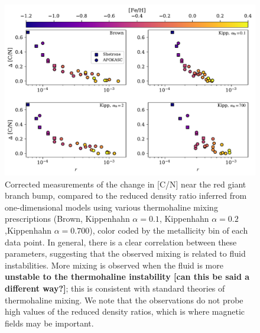

\begin{figure}[!tb]
\begin{center}
\includegraphics[width=\textwidth]{./figures/mixing_vs_r/mixing_vs_r.pdf}%
\caption{Corrected measurements of the change in [C/N] near the red giant branch bump, compared to the reduced density ratio inferred from one-dimensional models using various thermohaline mixing prescriptions (Brown, Kippenhahn $\alpha=0.1$, Kippenhahn $\alpha=0.2$,Kippenhahn $\alpha=0.700$), color coded by the metallicity bin of each data point. In general, there is a clear correlation between these parameters, suggesting that the observed mixing is related to fluid instabilities. More mixing is observed when the fluid is more \textbf{unstable to the thermohaline instability [can this be said a different way?]}; this is consistent with standard theories of thermohaline mixing. We note that the observations do not probe high values of the reduced density ratios, which is where magnetic fields may be important.
\label{Fig:punchline}
}
\end{center}
\end{figure}

